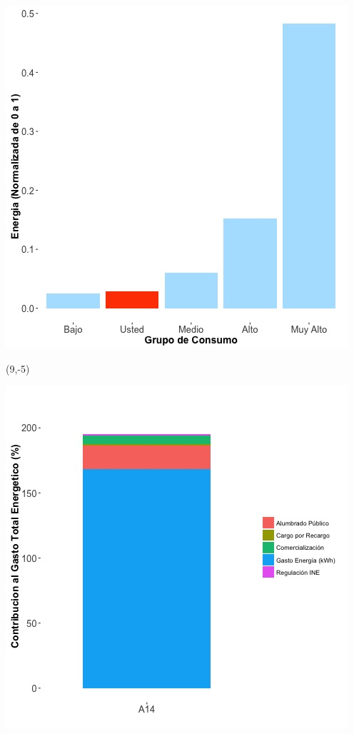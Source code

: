 \documentclass{article}\usepackage[]{graphicx}\usepackage[]{color}
\newenvironment{knitrout}{}{} %
\begin{document}
\begin{knitrout}
\color{fgcolor}
\includegraphics[scale=0.65]{figure/A14_neighbor_plot} 
\end{knitrout}

 \begin{textblock}{1}(9,-5)
\begin{minipage}{20em}
\begingroup

\endgroup
\end{minipage}
\end{textblock}

\begin{knitrout}
\color{fgcolor}
\includegraphics[scale=0.65]{figure/A14_costvars_plot.jpg} 
\end{knitrout}
\end{document}
